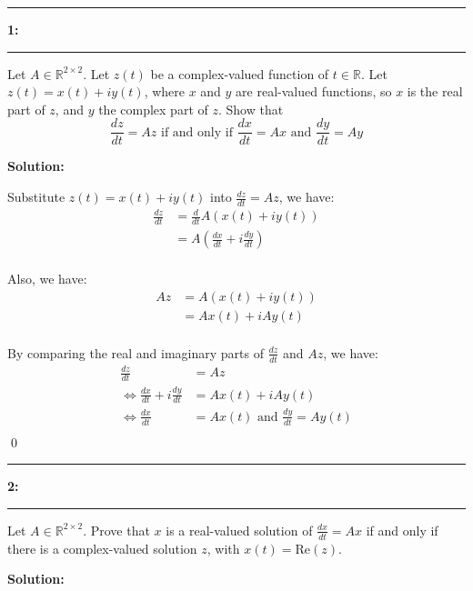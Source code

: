 \documentclass[11pt]{article}
\newcommand\question[2]{\vspace{.25in}\hrule\textbf{#1: #2}\vspace{.5em}\hrule\vspace{.10in}}
\begin{document}
\raggedright
\newcommand\NAME{Carl Kingsford}  %
\newcommand\ANDREWID{ckingsf}     %
\newcommand\HWNUM{1}              %



\question{1}{}
Let $A\in \mathbb{R}^{2\times 2}$. Let $z(t)$ be a complex-valued function of $t\in \mathbb{R}$.
Let $z(t) = x(t) + iy(t)$, where $x$ and $y$ are real-valued functions, so $x$ is the real part of $z$, and $y$ the
complex part of $z$. Show that
\[\frac{dz}{dt} = Az \text{ if and only if } \frac{dx}{dt} = Ax \text{ and } \frac{dy}{dt} = Ay\]

\textbf{Solution:}

Substitute $z(t) = x(t) + iy(t)$ into $\frac{dz}{dt} = Az$, we have:
\begin{align*}
\frac{dz}{dt} &= \frac{d}{dt}A(x(t) + iy(t))\\
&= A\left(\frac{dx}{dt} + i\frac{dy}{dt}\right)\\
\end{align*}

Also, we have:
\begin{align*}
Az &= A(x(t) + iy(t))\\
&= Ax(t) + iAy(t)\\
\end{align*}

By comparing the real and imaginary parts of $\frac{dz}{dt}$ and $Az$, we have:
\begin{align*}
    \frac{dz}{dt} &= Az\\
    \iff \frac{dx}{dt} + i\frac{dy}{dt} &= Ax(t) + iAy(t)\\
    \iff \frac{dx}{dt} &= Ax(t) \text{ and } \frac{dy}{dt} = Ay(t)\\
\end{align*}
\qed 

\question{2}{}
Let $A\in \mathbb{R}^{2 \times 2}$. Prove that $x$ is a real-valued solution of $\frac{dx}{dt} = Ax$ if and only if
there is a complex-valued solution $z$, with $x(t) = \mathrm{Re}(z)$.

\textbf{Solution:}
\end{document}
